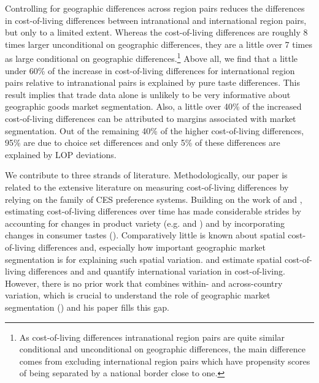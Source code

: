 Controlling for geographic differences across region pairs reduces the differences in cost-of-living differences between intranational and international region pairs, but only to a limited extent. Whereas the cost-of-living differences are roughly 8 times larger unconditional on geographic differences, they are a little over 7 times as large conditional on geographic differences.\footnote{As cost-of-living differences intranational region pairs are quite similar conditional and unconditional on geographic differences, the main difference comes from excluding international region pairs which have propensity scores of being separated by a national border close to one.} Above all, we find that a little under 60\% of the increase in cost-of-living differences for international region pairs relative to intranational pairs is explained by pure taste differences. This result implies that trade data alone is unlikely to be very informative about geographic goods market segmentation. Also, a little over 40\% of the increased cost-of-living differences can be attributed to margins associated with market segmentation. Out of the remaining 40\% of the higher cost-of-living differences, 95\% are due to choice set differences and only 5\% of these differences are explained by LOP deviations. 


We contribute to three strands of literature. Methodologically, our paper is related to the extensive literature on measuring cost-of-living differences by relying on the family of CES preference systems. Building on the work of \citet{Sato1976} and \citet{Vartia1976}, estimating cost-of-living differences over time has made considerable strides by accounting for changes in product variety (e.g. \citet{Feenstra1994} and \citet{Broda2006}) and by incorporating changes in consumer tastes (\citet{Redding2020}). Comparatively little is known about spatial cost-of-living differences and, especially how important geographic market segmentation is for explaining such spatial variation. \citet{Handbury2015} and \citet{Feenstra2020} estimate spatial cost-of-living differences and \cite{Argente2021} and \citet{Cavallo2022} quantify international variation in cost-of-living. However, there is no prior work that combines within- and across-country variation, which is crucial to understand the role of geographic market segmentation (\citet{Anderson2004}) and his paper fills this gap.

